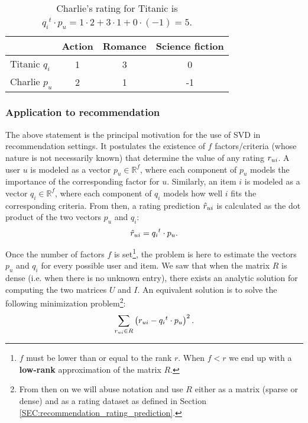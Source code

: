 \begin{table}[h!] \centering \begin{tabular}{ l   c  c  c }
\toprule
    & Action & Romance & Science fiction\\
  \midrule
    Titanic $q_i$ & 1 & 3 & 0\\
    Charlie $p_u$ & 2 & 1 & -1\\
\bottomrule
\end{tabular}
  \caption{Charlie's rating for Titanic is ${q_i}^t \cdot p_u = 1 \cdot 2 + 3
  \cdot 1 + 0 \cdot (-1) = 5$.}
\label{TAB:Charlie_Titanic}
\end{table}

\subsubsection{Application to recommendation}

The above statement is the principal motivation for the use of SVD in recommendation
settings. It postulates the existence of $f$ factors/criteria (whose nature is
not necessarily known) that determine the value of any rating $r_{ui}$.  A user
$u$ is modeled as a vector $p_u \in \mathbb{R}^f$, where each component of
$p_u$ models the importance of the corresponding factor for $u$.  Similarly, an
item $i$ is modeled as a vector $q_i \in \mathbb{R}^f$, where each component of
$q_i$ models how well $i$ fits the corresponding criteria.  From then, a rating
prediction $\hat{r}_{ui}$ is calculated as the dot product of the two vectors $p_u$
and $q_i$:
$$\hat{r}_{ui} = {q_i}^t \cdot p_u.$$

Once the number of factors $f$ is set\footnote{$f$ must be lower than or equal
to the rank $r$. When $f < r$ we end up with a \textbf{low-rank} approximation
of the matrix $R$.}, the problem is here to estimate the
vectors $p_u$ and $q_i$ for every possible user and item. We saw that when the
matrix $R$ is dense (i.e. when  there is no unknown entry), there exists an analytic
solution for computing the two matrices $U$ and $I$. An equivalent solution is
to solve the following minimization problem\footnote{From then on we will abuse
notation and use $R$ either as a matrix (sparse or dense) and as a rating
dataset as defined in Section \ref{SEC:recommendation_rating_prediction}.}:
$$
\sum_{r_{ui} \in R} \left(r_{ui} - {q_i}^t \cdot p_u \right)^2.
$$

